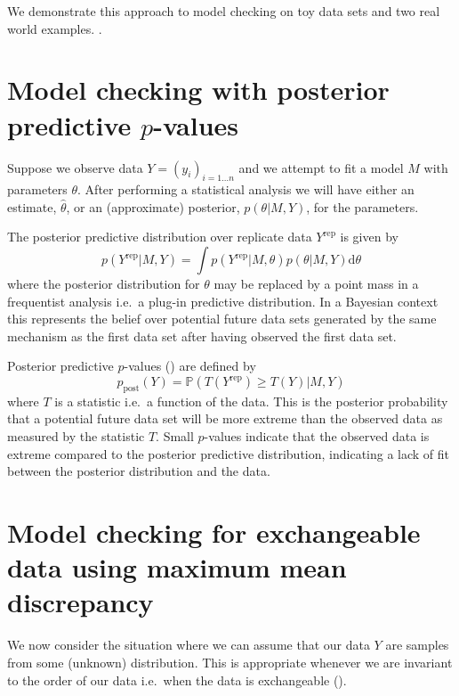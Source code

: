 \documentclass{article} %
\def\ie{i.e.\ }
\begin{document}
We demonstrate this approach to model checking on toy data sets and two real world examples.
.

\section{Model checking with posterior predictive $p$-values}

Suppose we observe data $Y = (y_i)_{i=1\ldots n}$ and we attempt to fit a model $M$ with parameters $\theta$.
After performing a statistical analysis we will have either an estimate, $\hat\theta$, or an (approximate) posterior, $p(\theta|M,Y)$, for the parameters.

The posterior predictive distribution over replicate data $Y^\textrm{rep}$ is given by
\begin{equation}
p(Y^\textrm{rep}|M,Y) = \int p(Y^\textrm{rep}|M,\theta)p(\theta|M,Y)\mathrm{d}\theta
\end{equation}
where the posterior distribution for $\theta$ may be replaced by a point mass in a frequentist analysis \ie a plug-in predictive distribution.
In a Bayesian context this represents the belief over potential future data sets generated by the same mechanism as the first data set after having observed the first data set.

Posterior predictive $p$-values () are defined by
\begin{equation}
p_\textrm{post}(Y) = \mathbb{P}(T(Y^\textrm{rep})\geq T(Y)|M,Y)
\end{equation}
where $T$ is a statistic \ie a function of the data.
This is the posterior probability that a potential future data set will be more extreme than the observed data as measured by the statistic $T$.
Small $p$-values indicate that the observed data is extreme compared to the posterior predictive distribution, indicating a lack of fit between the posterior distribution and the data.

\section{Model checking for exchangeable data using maximum mean discrepancy}

We now consider the situation where we can assume that our data $Y$ are \iid samples from some (unknown) distribution.
This is appropriate whenever we are invariant to the order of our data \ie when the data is exchangeable ().
\end{document}
